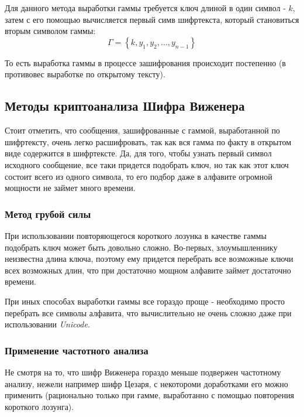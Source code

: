 \documentclass[a4paper]{article}
\begin{document}
  Для данного метода выработки гаммы требуется ключ длиной в один символ -  $k$,
  затем с его помощью вычисляется первый симв шифртекста, который становиться вторым
  символом гаммы:
  \begin{equation}
    \Gamma = \left\{k, y_1, y_2, \dots, y_{n - 1}\right\}
  \end{equation}

  То есть выработка гаммы в процессе зашифрования происходит постепенно (в противовес
  выработке по открытому тексту).

  \subsection{Методы криптоанализа Шифра Виженера}

  Стоит отметить, что сообщения, зашифрованные с гаммой, выработанной по шифртексту,
  очень легко расшифровать, так как вся гамма по факту в открытом виде содержится
  в шифртексте. Да, для того, чтобы узнать первый символ исходного сообщение, все таки
  придется подобрать ключ, но так как этот ключ состоит всего из одного символа,
  то его подбор даже в алфавите огромной мощности не займет много времени.

  \subsubsection{Метод грубой силы}

  При использовании повторяющегося короткого лозунка в качестве гаммы подобрать ключ
  может быть довольно сложно. Во-первых, злоумышленнику неизвестна длина ключа, поэтому
  ему придется перебрать все возможные ключи всех возможных длин, что при достаточно мощном
  алфавите займет достаточно времени.

  При иных способах выработки гаммы все гораздо проще - необходимо просто перебрать все символы
  алфавита, что вычислительно не очень сложно даже при использовании \textit{Unicode}.

  \subsubsection{Применение частотного анализа}

  Не смотря на то, что шифр Виженера гораздо меньше подвержен частотному анализу, нежели например
  шифр Цезаря, с некотороми доработками его можно применить (рационально только при гамме,
  выработанно с помощью повторения короткого лозунга).
\end{document}
